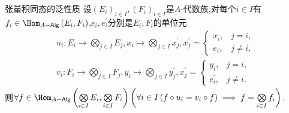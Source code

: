 \begin{corollary}{张量积同态的泛性质}{}
	设$\left(E_{i}\right)_{i\in I},\left(F_{i}\right)_{i\in I}$是$A$-代数族,对每个$i\in I$有$f_{i}\in\Hom_{A-\mathsf{Alg}}\left(E_{i},F_{i}\right)$,$e_{i},e_{i}^{\prime}$分别是$E_{i},F_{i}$的单位元
	\begin{gather*}
		u_{i}:E_{i}\to\bigotimes\limits_{j\in I}E_{j},x_{i}\mapsto\bigotimes\limits_{j\in I}x_{j}^{\prime},x_{j}^{\prime}=
		\begin{cases}
			x_{i},&j=i,\\
			e_{i},&j\neq i,
		\end{cases}\\
		v_{i}:F_{i}\to\bigotimes\limits_{j\in I}F_{j},y_{i}\mapsto\bigotimes\limits_{j\in I}y_{j}^{\prime},x_{j}^{\prime}=
		\begin{cases}
			y_{i},&j=i,\\
			e_{i}^{\prime},&j\neq i.
		\end{cases}
	\end{gather*}
	则$\forall f\in\Hom_{A-\mathsf{Alg}}\left(\bigotimes\limits_{i\in I}E_{i},\bigotimes\limits_{i\in I}F_{i}\right)\left(\forall i\in I\left(f\circ u_{i}=v_{i}\circ f\right)\implies f=\bigotimes\limits_{i\in I}f_{i}\right)$.
\end{corollary}























